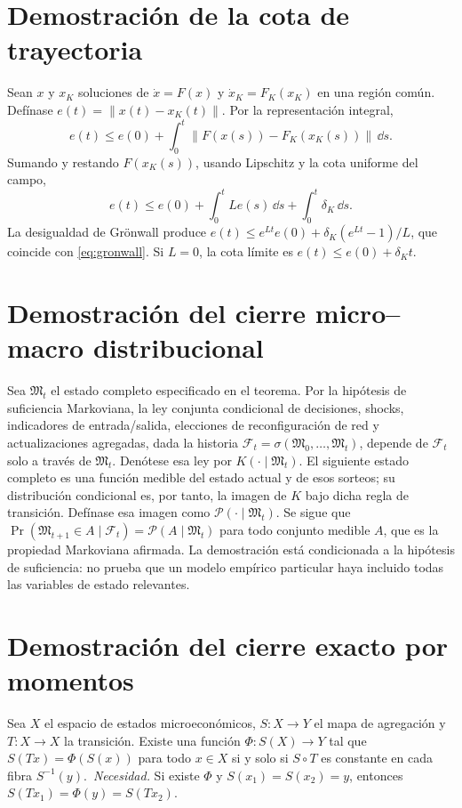 \documentclass[11pt,a4paper]{article}
\begin{document}
\section{Demostración de la cota de trayectoria}
Sean $x$ y $x_K$ soluciones de $\dot x=F(x)$ y $\dot x_K=F_K(x_K)$ en una región común. Defínase $e(t)=\|x(t)-x_K(t)\|$. Por la representación integral,
\[
e(t)\leq e(0)+\int_0^t\|F(x(s))-F_K(x_K(s))\|\,\dd s.
\]
Sumando y restando $F(x_K(s))$, usando Lipschitz y la cota uniforme del campo,
\[
e(t)\leq e(0)+\int_0^t Le(s)\,\dd s+\int_0^t\delta_K\,\dd s.
\]
La desigualdad de Grönwall produce $e(t)\leq e^{Lt}e(0)+\delta_K(e^{Lt}-1)/L$, que coincide con \eqref{eq:gronwall}. Si $L=0$, la cota límite es $e(t)\leq e(0)+\delta_Kt$.

\section{Demostración del cierre micro--macro distribucional}
Sea $\mathfrak M_t$ el estado completo especificado en el teorema. Por la hipótesis de suficiencia Markoviana, la ley conjunta condicional de decisiones, shocks, indicadores de entrada/salida, elecciones de reconfiguración de red y actualizaciones agregadas, dada la historia $\mathcal F_t=\sigma(\mathfrak M_0,\ldots,\mathfrak M_t)$, depende de $\mathcal F_t$ solo a través de $\mathfrak M_t$. Denótese esa ley por $K(\cdot\mid\mathfrak M_t)$. El siguiente estado completo es una función medible del estado actual y de esos sorteos; su distribución condicional es, por tanto, la imagen de $K$ bajo dicha regla de transición. Defínase esa imagen como $\mathcal P(\cdot\mid\mathfrak M_t)$. Se sigue que $\Pr(\mathfrak M_{t+1}\in A\mid\mathcal F_t)=\mathcal P(A\mid\mathfrak M_t)$ para todo conjunto medible $A$, que es la propiedad Markoviana afirmada. La demostración está condicionada a la hipótesis de suficiencia: no prueba que un modelo empírico particular haya incluido todas las variables de estado relevantes.

\section{Demostración del cierre exacto por momentos}
Sea $X$ el espacio de estados microeconómicos, $S:X\to Y$ el mapa de agregación y $T:X\to X$ la transición. Existe una función $\Phi:S(X)\to Y$ tal que $S(Tx)=\Phi(S(x))$ para todo $x\in X$ si y solo si $S\circ T$ es constante en cada fibra $S^{-1}(y)$.\
\emph{Necesidad.} Si existe $\Phi$ y $S(x_1)=S(x_2)=y$, entonces $S(Tx_1)=\Phi(y)=S(Tx_2)$.
\end{document}
